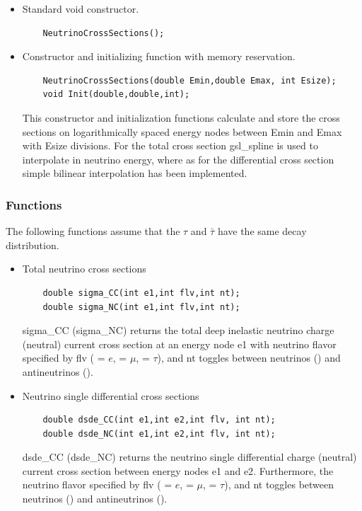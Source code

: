 \documentclass[3p,12pt,authoryear]{elsarticle}
\begin{document}
\begin{itemize}
\item Standard void constructor.
  \begin{lstlisting}
    NeutrinoCrossSections();
  \end{lstlisting}
\item Constructor and initializing function with memory reservation.
  \begin{lstlisting}
    NeutrinoCrossSections(double Emin,double Emax, int Esize);
    void Init(double,double,int);
  \end{lstlisting}
This constructor and initialization functions calculate and store the cross sections on logarithmically spaced energy nodes between {\ttfamily Emin} and {\ttfamily Emax} with {\ttfamily Esize} divisions. For the total cross section {\ttfamily gsl\_spline} \citep{gough2009gnu} is used to interpolate in neutrino energy, where as for the differential cross section simple bilinear interpolation has been implemented.
\end{itemize}

\subsubsection{Functions}

The following functions assume that the $\tau$ and $\bar{\tau}$ have the same decay distribution.

\begin{itemize}
\item Total neutrino cross sections
  \begin{lstlisting}
    double sigma_CC(int e1,int flv,int nt);
    double sigma_NC(int e1,int flv,int nt);
  \end{lstlisting}
     {\ttfamily sigma\_CC} ({\ttfamily sigma\_NC}) returns the total deep inelastic neutrino charge (neutral) current cross section at an energy node {\ttfamily e1} with neutrino flavor specified by {\ttfamily flv} ({ = $e$}, { = $\mu$}, { = $\tau$}), and {\ttfamily nt} toggles between neutrinos ({}) and antineutrinos ({}).
\item Neutrino single differential cross sections
  \begin{lstlisting}
    double dsde_CC(int e1,int e2,int flv, int nt);
    double dsde_NC(int e1,int e2,int flv, int nt);
  \end{lstlisting}
     {\ttfamily dsde\_CC} ({\ttfamily dsde\_NC}) returns the neutrino single differential charge (neutral) current cross section between energy nodes {\ttfamily e1} and {\ttfamily e2}. Furthermore, the neutrino flavor specified by {\ttfamily flv} ({ = $e$}, { = $\mu$}, { = $\tau$}), and {\ttfamily nt} toggles between neutrinos ({}) and antineutrinos ({}).
\end{itemize}
\end{document}
